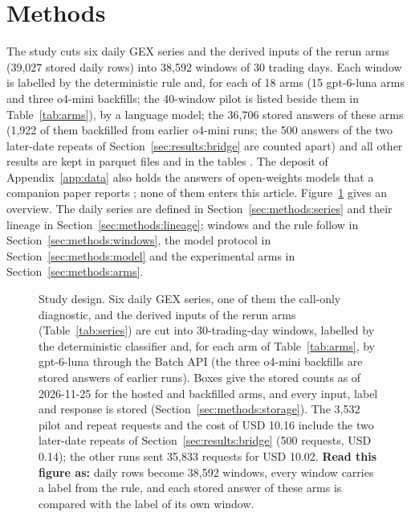 \section{Methods}
\label{sec:methods}

The study cuts six daily GEX series and the derived inputs of the rerun arms (39{,}027 stored daily rows) into 38{,}592 windows of 30 trading days. Each window is labelled by the deterministic rule and, for each of 18 arms (15 gpt-6-luna arms and three o4-mini backfills; the 40-window pilot is listed beside them in Table~\ref{tab:arms}), by a language model; the 36{,}706 stored answers of these arms (1{,}922 of them backfilled from earlier o4-mini runs; the 500 answers of the two later-date repeats of Section~\ref{sec:results:bridge} are counted apart) and all other results are kept in parquet files and in the tables . The deposit of Appendix~\ref{app:data} also holds the answers of open-weights models that a companion paper reports \cite{regan2026openweights}; none of them enters this article.
Figure~\ref{fig:design} gives an overview. The daily series are defined in Section~\ref{sec:methods:series} and their lineage in Section~\ref{sec:methods:lineage}; windows and the rule follow in Section~\ref{sec:methods:windows}, the model protocol in Section~\ref{sec:methods:model} and the experimental arms in Section~\ref{sec:methods:arms}.

\begin{figure}[!htbp]
\centering
\resultfigure{\figDesign}
\caption{Study design. Six daily GEX series, one of them the call-only diagnostic, and the derived inputs of the rerun arms (Table~\ref{tab:series}) are cut into 30-trading-day windows, labelled by the deterministic classifier and, for each arm of Table~\ref{tab:arms}, by gpt-6-luna through the Batch API (the three o4-mini backfills are stored answers of earlier runs). Boxes give the stored counts as of 2026-11-25 for the hosted and backfilled arms, and every input, label and response is stored (Section~\ref{sec:methods:storage}). The 3{,}532 pilot and repeat requests and the cost of USD 10.16 include the two later-date repeats of Section~\ref{sec:results:bridge} (500 requests, USD 0.14); the other runs sent 35{,}833 requests for USD 10.02. \textbf{Read this figure as:} daily rows become 38{,}592 windows, every window carries a label from the rule, and each stored answer of these arms is compared with the label of its own window.}
\label{fig:design}
\end{figure}

